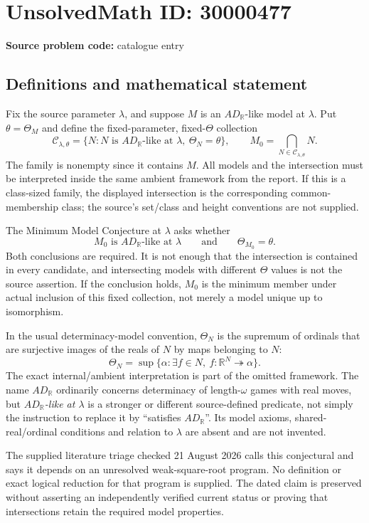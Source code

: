 \documentclass[11pt]{article}
\newcommand{\R}{\mathbb{R}}
\begin{document}
\section*{UnsolvedMath ID: 30000477}
\textbf{Source problem code:} catalogue entry
\subsection{Definitions and mathematical statement}
Fix the source parameter $\lambda$, and suppose $M$ is an $AD_{\R}$-like model at $\lambda$. Put $\theta=\Theta_M$ and define the fixed-parameter, fixed-$\Theta$ collection
\[
 \mathcal C_{\lambda,\theta}
 =\{N:N\text{ is }AD_{\R}\text{-like at }\lambda,
                          \ \Theta_N=\theta\},\qquad
 M_0=\bigcap_{N\in\mathcal C_{\lambda,\theta}}N.
\]
The family is nonempty since it contains $M$. All models and the intersection must be interpreted inside the same ambient framework from the report. If this is a class-sized family, the displayed intersection is the corresponding common-membership class; the source's set/class and height conventions are not supplied.

The Minimum Model Conjecture at $\lambda$ asks whether
\[
 M_0\text{ is }AD_{\R}\text{-like at }\lambda
 \qquad\text{and}\qquad \Theta_{M_0}=\theta.
\]
Both conclusions are required. It is not enough that the intersection is contained in every candidate, and intersecting models with different $\Theta$ values is not the source assertion. If the conclusion holds, $M_0$ is the minimum member under actual inclusion of this fixed collection, not merely a model unique up to isomorphism.

In the usual determinacy-model convention, $\Theta_N$ is the supremum of ordinals that are surjective images of the reals of $N$ by maps belonging to $N$:
\[
 \Theta_N=\sup\{\alpha:\exists f\in N,
                         \ f:\R^N\twoheadrightarrow\alpha\}.
\]
The exact internal/ambient interpretation is part of the omitted framework. The name $AD_{\R}$ ordinarily concerns determinacy of length-$\omega$ games with real moves, but \emph{$AD_{\R}$-like at $\lambda$} is a stronger or different source-defined predicate, not simply the instruction to replace it by ``satisfies $AD_{\R}$''. Its model axioms, shared-real/ordinal conditions and relation to $\lambda$ are absent and are not invented.

The supplied literature triage checked 21 August 2026 calls this conjectural and says it depends on an unresolved weak-square-root program. No definition or exact logical reduction for that program is supplied. The dated claim is preserved without asserting an independently verified current status or proving that intersections retain the required model properties.
\end{document}
